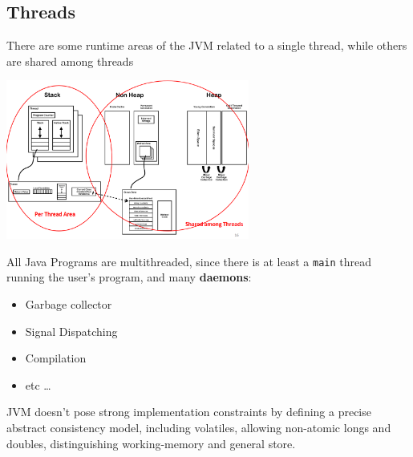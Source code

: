 \subsection{Threads}
There are some runtime areas of the JVM related to a single thread, while others are shared among threads

\begin{center}
    \includegraphics[width=0.6\textwidth]{images/JVM_Runtime_areas.png}
\end{center}
All Java Programs are multithreaded, since there is at least a \lstinline{main} thread running the user's program, and many \textbf{daemons}:
\begin{itemize}
    \item Garbage collector
    \item Signal Dispatching
    \item Compilation
    \item etc \dots
\end{itemize}
JVM doesn't pose strong implementation constraints by defining a precise abstract consistency model, including volatiles, allowing non-atomic longs and doubles, distinguishing working-memory and general store.


